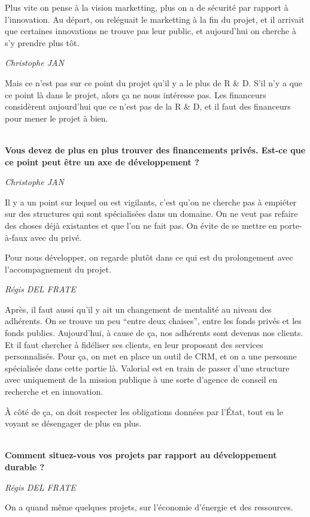 \documentclass[a4paper,12pt]{report}
\begin{document}
	Plus vite on pense à la vision marketting, plus on a de sécurité par rapport à l’innovation. Au départ, on reléguait le marketting à la fin du projet, et il arrivait que certaines innovations ne trouve pas leur public, et aujourd’hui on cherche à s’y prendre plus tôt.

	\emph{Christophe JAN}
	 
    Mais ce n’est pas sur ce point du projet qu’il y a le plus de R \& D. S’il n’y a que ce point là dans le projet, alors ça ne nous intéresse pas. Les financeurs considèrent aujourd’hui que ce n’est pas de la R \& D, et il faut des financeurs pour mener le projet à bien.

	\textbf{\\Vous devez de plus en plus trouver des financements privés. Est-ce que ce point peut être un axe de développement ?}

	\emph{Christophe JAN}
	
    Il y a un point sur lequel on est vigilants, c’est qu’on ne cherche pas à empiéter sur des structures qui sont spécialisées dans un domaine. On ne veut pas refaire des choses déjà existantes et que l’on ne fait pas. On évite de se mettre en porte-à-faux avec du privé.
  
    Pour nous développer, on regarde plutôt dans ce qui est du prolongement avec l’accompagnement du projet.

	\emph{Régis DEL FRATE}
    
    Après, il faut aussi qu’il y ait un changement de mentalité au niveau des adhérents. On se trouve un peu “entre deux chaises”, entre les fonds privés et les fonds publics. Aujourd’hui, à cause de ça, nos adhérents sont devenus nos clients. Et il faut chercher à fidéliser ses clients, en leur proposant des services personnalisés. Pour ça, on met en place un outil de CRM, et on a une personne spécialisée dans cette partie là. Valorial est en train de passer d’une structure avec uniquement de la mission publique à une sorte d’agence de conseil en recherche et en innovation.
 
    À côté de ça, on doit respecter les obligations données par l’État, tout en le voyant se désengager de plus en plus. 

	\textbf{\\Comment situez-vous vos projets par rapport au développement durable ?}

	\emph{Régis DEL FRATE}
    
    On a quand même quelques projets, sur l’économie d’énergie et des ressources.
\end{document}
